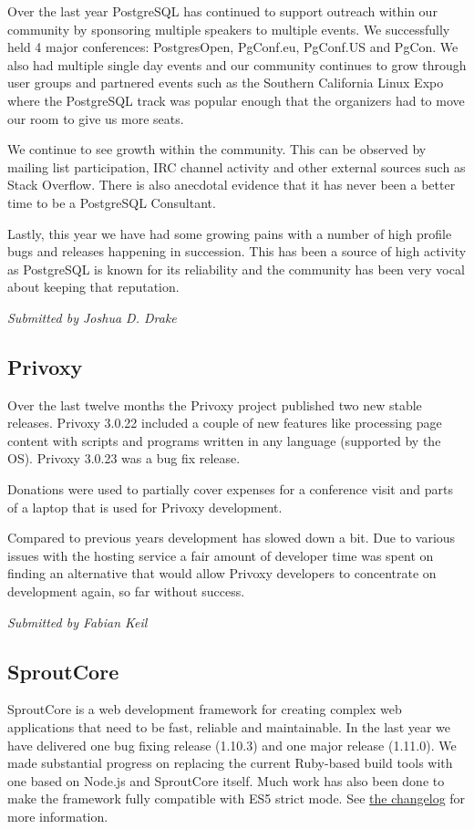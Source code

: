 \documentclass[letterpaper]{report}
\begin{document}
Over the last year PostgreSQL has continued to support outreach within our
community by sponsoring multiple speakers to multiple events. We
successfully held 4 major conferences: PostgresOpen, PgConf.eu, PgConf.US
and PgCon. We also had multiple single day events and our community
continues to grow through user groups and partnered events such as the
Southern California Linux Expo where the PostgreSQL track was popular
enough that the organizers had to move our room to give us more seats.

We continue to see growth within the community. This can be observed by
mailing list participation, IRC channel activity and other external sources
such as Stack Overflow. There is also anecdotal evidence that it has never
been a better time to be a PostgreSQL Consultant.

Lastly, this year we have had some growing pains with a number of high
profile bugs and releases happening in succession. This has been a source
of high activity as PostgreSQL is known for its reliability and the
community has been very vocal about keeping that reputation.

{\em Submitted by Joshua D. Drake}

\subsection{Privoxy}

Over the last twelve months the Privoxy project published two new stable
releases. Privoxy 3.0.22 included a couple of new features like processing
page content with scripts and programs written in any language (supported
by the OS).  Privoxy 3.0.23 was a bug fix release.

Donations were used to partially cover expenses for a conference visit and
parts of a laptop that is used for Privoxy development.

Compared to previous years development has slowed down a bit.  Due to
various issues with the hosting service a fair amount of developer time was
spent on finding an alternative that would allow Privoxy developers to
concentrate on development again, so far without success.

{\em Submitted by Fabian Keil}

\subsection{SproutCore}

SproutCore is a web development framework for creating complex web
applications that need to be fast, reliable and maintainable.  In the last
year we have delivered one bug fixing release (1.10.3) and one major
release (1.11.0).  We made substantial progress on replacing the current
Ruby-based build tools with one based on Node.js and SproutCore itself.
Much work has also been done to make the framework fully compatible with
ES5 strict mode.  See
\href{https://github.com/sproutcore/sproutcore/blob/master/CHANGELOG.md}{the
changelog} for more information.
\end{document}
